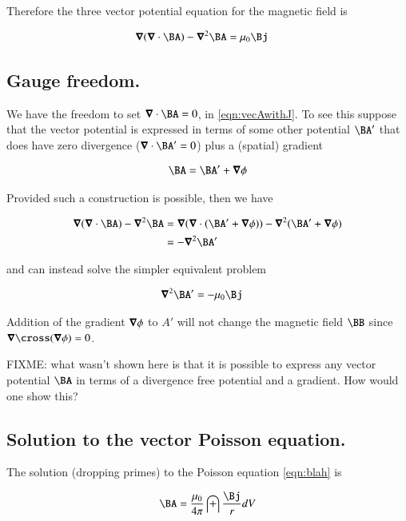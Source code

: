 \documentclass{article}
\begin{document}
Therefore the three vector potential equation for the magnetic field is

\begin{align}\label{eqn:vecAwithJ}
\spacegrad (\spacegrad \cdot \BA) - \spacegrad^2 \BA &= \mu_0 \Bj
\end{align}

\subsection{ Gauge freedom. }

We have the freedom to set $\spacegrad \cdot \BA = 0$, in \ref{eqn:vecAwithJ}.  To see this suppose that the vector potential is
expressed in terms of some other potential $\BA'$ that does have zero divergence ($\spacegrad \cdot \BA' = 0$) plus a (spatial) gradient

\begin{align*}
\BA = \BA' + \spacegrad \phi
\end{align*}

Provided such a construction is possible, then we have

\begin{align*}
\spacegrad (\spacegrad \cdot \BA) - \spacegrad^2 \BA
&=
\spacegrad (\spacegrad \cdot (\BA' + \spacegrad \phi)) - \spacegrad^2 (\BA' + \spacegrad \phi) \\
&=
- \spacegrad^2 \BA'
\end{align*}

and can instead solve the simpler equivalent problem

\begin{align}\label{eqn:blah}
\spacegrad^2 \BA'  &= -\mu_0 \Bj
\end{align}

Addition of the gradient $\boldsymbol{\nabla} \phi$ to $A'$ will not change the magnetic field $\BB$ since $\spacegrad \cross (\spacegrad \phi) = 0$.

FIXME: what wasn't shown here is that it is possible to express any vector potential $\BA$ in terms of a divergence free potential and a
gradient.  How would one show this?

\subsection{ Solution to the vector Poisson equation. }

The solution (dropping primes) to the Poisson equation \ref{eqn:blah} is

\begin{align*}
\BA = \frac{\mu_0}{4 \pi} \int \frac{\Bj}{r} dV
\end{align*}
\end{document}
